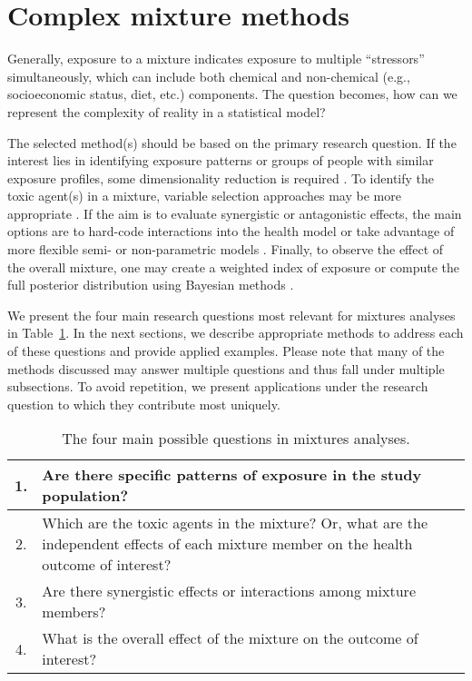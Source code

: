 \section{Complex mixture methods}\label{sec:Methods}

Generally, exposure to a mixture indicates exposure to multiple ``stressors'' simultaneously, which can include both chemical and non-chemical (e.g., socioeconomic status, diet, etc.) components. The question becomes, how can we represent the complexity of reality in a statistical model? 

The selected method(s) should be based on the primary research question. If the interest lies in identifying exposure patterns or groups of people with similar exposure profiles, some dimensionality reduction is required \cite{jolliffe02, thompson04, paatero94}. To identify the toxic agent(s) in a mixture, variable selection approaches may be more appropriate \cite{tibshirani96, zou05}. If the aim is to evaluate synergistic or antagonistic effects, the main options are to hard-code interactions into the health model or take advantage of more flexible semi- or non-parametric models \cite{bobb2014bayesian,coull2015,bobb2018statistical}. Finally, to observe the effect of the overall mixture, one may create a weighted index of exposure or compute the full posterior distribution using Bayesian methods \cite{carrico15,bobb2014bayesian,coull2015}.

We present the four main research questions most relevant for mixtures analyses in Table~\ref{tab:qx}. In the next sections, we describe appropriate methods to address each of these questions and provide applied examples. Please note that many of the methods discussed may answer multiple questions and thus fall under multiple subsections. To avoid repetition, we present applications under the research question to which they contribute most uniquely. \\

\begingroup
\renewcommand{\arraystretch}{1.4}
\begin{table}[ht]
\begin{center}
\caption[The four main questions in mixtures analyses]{The four main possible questions in mixtures analyses.}
\label{tab:qx}
\begin{tabular}{c p{15cm}}
\hline
\hline
  1. & Are there specific patterns of exposure in the study population? \\
  \hline
  2. & Which are the toxic agents in the mixture? Or, what are the independent effects of each mixture member on the health outcome of interest? \\
  \hline
  3. & Are there synergistic effects or interactions among mixture members? \\
  \hline
  4. & What is the overall effect of the mixture on the outcome of interest? \\
\hline
\hline
\end{tabular}
\end{center}
\end{table}
\endgroup
\vspace{-2em}

